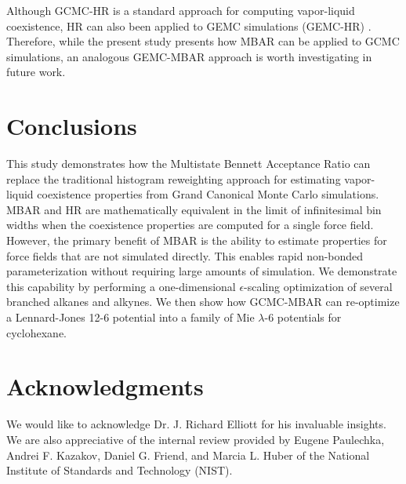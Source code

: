 \documentclass[journal=jced,manuscript=article]{achemso}
\begin{document}

Although GCMC-HR is a standard approach for computing vapor-liquid coexistence, HR can also been applied to GEMC simulations (GEMC-HR) \cite{Boulougouris2010}. Therefore, while the present study presents how MBAR can be applied to GCMC simulations, an analogous GEMC-MBAR approach is worth investigating in future work.

%

\section{Conclusions} \label{sec: Conclusions}

This study demonstrates how the Multistate Bennett Acceptance Ratio can replace the traditional histogram reweighting approach for estimating vapor-liquid coexistence properties from Grand Canonical Monte Carlo simulations. MBAR and HR are mathematically equivalent in the limit of infinitesimal bin widths when the coexistence properties are computed for a single force field. However, the primary benefit of MBAR is the ability to estimate properties for force fields that are not simulated directly. This enables rapid non-bonded parameterization without requiring large amounts of simulation. We demonstrate this capability by performing a one-dimensional $\epsilon$-scaling optimization of several branched alkanes and alkynes. We then show how GCMC-MBAR can re-optimize a Lennard-Jones 12-6 potential into a family of Mie $\lambda$-6 potentials for cyclohexane. 

\section{Acknowledgments}

We would like to acknowledge Dr. J. Richard Elliott for his invaluable insights. We are also appreciative of the internal review provided by Eugene Paulechka, Andrei F. Kazakov, Daniel G. Friend, and Marcia L. Huber of the National Institute of Standards and Technology (NIST).
\end{document}
